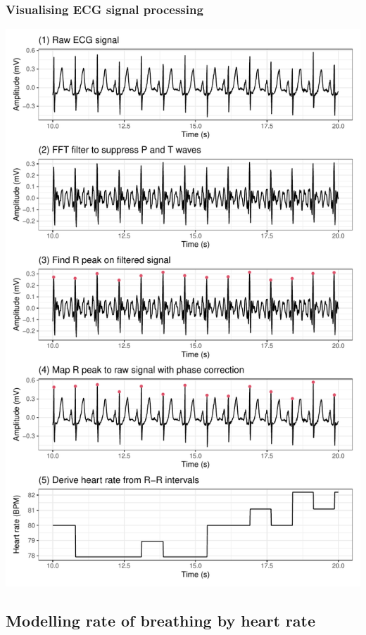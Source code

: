 \documentclass[
]{article}
\begin{document}
\newpage

\hypertarget{visualising-ecg-signal-processing}{%
\subsubsection{Visualising ECG signal
processing}\label{visualising-ecg-signal-processing}}

\begin{center}\includegraphics{report_files/figure-latex/ecg-process-1} \end{center}

\hypertarget{modelling-rate-of-breathing-by-heart-rate}{%
\subsection{Modelling rate of breathing by heart
rate}\label{modelling-rate-of-breathing-by-heart-rate}}
\end{document}
